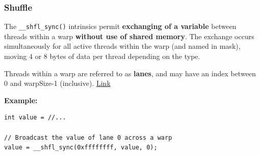\documentclass[aspectratio=169,handout]{beamer}
\begin{document}



\begin{frame}[fragile]
\frametitle{Shuffle}

	\begin{mdframed}[frametitle={CUDA Programming Guide}]
The \texttt{\_\_shfl\_sync()} intrinsics permit \textbf{exchanging of a variable} between threads within a warp \textbf{without use of shared memory}. The exchange occurs simultaneously for all active threads within the warp (and named in mask), moving 4 or 8 bytes of data per thread depending on the type. 

Threads within a warp are referred to as \textbf{lanes}, and may have an index between 0 and warpSize-1 (inclusive). \href{https://docs.nvidia.com/cuda/cuda-c-programming-guide/index.html#warp-shuffle-functions}{Link}
\end{mdframed}
\vspace{0.5cm}
\textbf{Example:}
\begin{lstlisting}
int value = //...

// Broadcast the value of lane 0 across a warp
value = __shfl_sync(0xffffffff, value, 0);
\end{lstlisting}

\end{frame}
\end{document}
